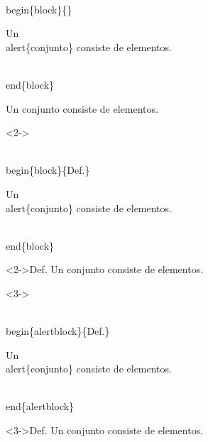 \documentclass[11pt]{beamer}
\begin{document}
\begin{frame}


\begin{block}{}
\begin{semiverbatim}\scriptsize
\\begin\{block\}\{\}

Un  \\alert\{conjunto\} consiste de elementos.

\\end\{block\}
\end{semiverbatim}
\end{block}

\begin{block}{}
Un \alert{conjunto} consiste de elementos.
\end{block}





\begin{block}<2->{}
\begin{semiverbatim}\scriptsize
\\begin\{block\}<2->\{Def.\}

Un  \\alert\{conjunto\} consiste de elementos.

\\end\{block\}
\end{semiverbatim}
\end{block}

\begin{block}<2->{Def.}
Un \alert{conjunto} consiste de elementos.
\end{block}


\begin{block}<3->{}
\begin{semiverbatim}\scriptsize
\\begin\{alertblock\}\{Def.\}

Un  \\alert\{conjunto\} consiste de elementos.

\\end\{alertblock\}
\end{semiverbatim}
\end{block}

\begin{alertblock}<3->{Def.}
Un \alert{conjunto} consiste de elementos.
\end{alertblock}\end{frame}
\end{document}
